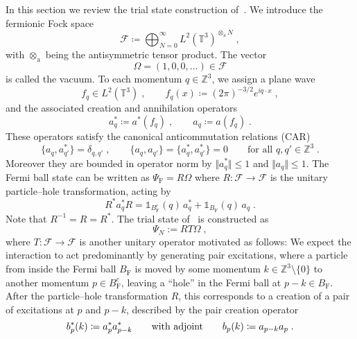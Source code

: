 \documentclass[12pt,a4paper]{article}
\numberwithin{equation}{section}
\newcommand{\cF}{\mathcal{F}}
\newcommand{\TTT}{\mathbb{T}}
\newcommand{\ZZZ}{\mathbb{Z}}
\newcommand{\1}{\mathbb{I}}
\newcommand{\F}{\mathrm{F}}
\newcommand{\FS}{\mathrm{F}}
\newcommand{\Z}{\mathbb{Z}}
\newcommand{\T}{\mathbb{T}}
\theoremstyle{plain}
\theoremstyle{definition}
\theoremstyle{remark}
\theoremstyle{plain}
\theoremstyle{definition}
\theoremstyle{remark}
\begin{document}
In this section we review the trial state construction of~\cite{CHN23}. We introduce the fermionic Fock space
\begin{equation}
	\cF \coloneq \bigoplus_{N=0}^\infty L^2(\T^3)^{\otimes_{\mathrm{a}} N} \;,
\end{equation}
with $ \otimes_{\mathrm{a}} $ being the antisymmetric tensor product. The vector
\begin{equation}
\Omega = (1,0,0,\ldots) \in \cF
\end{equation}
is called the vacuum. To each momentum $ q \in \ZZZ^3 $, we assign a plane wave
\begin{equation}
	f_q \in L^2(\TTT^3) \;, \qquad
	f_q(x) \coloneq (2 \pi)^{-3/2} e^{i q \cdot x} \;,
\end{equation}
and the associated creation and annihilation operators
\begin{equation}
	a^*_q \coloneq a^*(f_q) \;, \qquad
	a_q \coloneq a(f_q) \;.
\end{equation}
These operators satisfy the canonical anticommutation relations (CAR)
\begin{equation} \label{eq:CAR}
	\{a_q, a_{q'}^*\} = \delta_{q, q'} \;, \qquad
	\{a_q, a_{q'}\} = \{a_q^*, a_{q'}^*\} = 0 \qquad \text{for all } q, q' \in \ZZZ^3\;.
\end{equation}
Moreover they are bounded in operator norm by $ \Vert a_q^* \Vert \leq 1$ and $\Vert a_q \Vert \le 1 $.
The Fermi ball state can be written as $ \Psi_{\FS} = R \Omega $ where $ R: \cF \to \cF $ is the unitary particle--hole transformation, acting by
\begin{equation} \label{eq:R}
	R^* a_q^* R 	= \mathds{1}_{B_{\F}^c}(q) \, a_q^* 	+ \mathds{1}_{B_{\F}}(q) \, a_q \;.
\end{equation}
Note that $ R^{-1} = R = R^* $. The trial state of~\cite{CHN23} is constructed as
\begin{equation} \label{eq:Psitrial}
	\Psi_N := R T \Omega \;,
\end{equation}
where $ T: \cF \to \cF $ is another unitary operator motivated as follows: We expect the interaction to act predominantly by generating pair excitations, where a particle from inside the Fermi ball $ B_{\F} $ is moved by some momentum $ k \in \Z^3 \setminus \{ 0 \} $ to another momentum $ p \in B_{\F}^c $, leaving a ``hole'' in the Fermi ball at $ p-k \in B_{\F} $. After the particle--hole transformation $ R $, this corresponds to a creation of a pair of excitations at $ p $ and $ p-k $, described by the pair creation operator
\begin{equation} \label{eq:b}
	b^*_p(k) \coloneq a_p^* a_{p-k}^* 
	\qquad \textnormal{with adjoint} \qquad
	b_p(k) \coloneq a_{p-k} a_p \;.
\end{equation}
\end{document}
